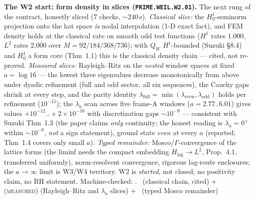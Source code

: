 \documentclass[11pt,a4paper]{article}
\theoremstyle{definition}
\begin{document}
\par\smallskip\noindent\textbf{The W2 start: form density in slices
(\texttt{PRIME.WEIL.W2.01}).}
The next rung of the contract, honestly sliced ($7$ checks,
${\sim}240$\,s).  \emph{Classical slice:} the $H^1_0$-seminorm
projection onto the hat space \emph{is} nodal interpolation (1-D exact
fact), and FEM density holds at the classical rate on smooth odd test
functions ($H^1$ rates $1.000$, $L^2$ rates $2.000$ over
$M=92/184/368/736$); with $Q_W$ $H^1$-bounded (Suzuki \S8.4) and
$H^1_0$ a form core (Thm~1.1) this is the classical density chain ---
cited, not re-proved.  \emph{Measured slices:} Rayleigh--Ritz on the
\emph{nested} window spaces at fixed $a=\log16$ --- the lowest three
eigenvalues decrease monotonically from above under dyadic refinement
(full and odd sector, all six sequences), the Cauchy gaps shrink at
every step, and the parity identity
$\lambda_{\mathrm{full}}=\min(\lambda_{\mathrm{even}},
\lambda_{\mathrm{odd}})$ holds per refinement ($10^{-15}$); the
$\lambda_a$ scan across five frame-A windows ($a=2.77..6.01$) gives
values $+10^{-12}..+2\times10^{-10}$ with discretization gaps
${\sim}10^{-9}$ --- consistent with Suzuki Thm~1.3 (the paper claims
\emph{only} continuity; the honest reading is $\lambda_a=0^+$ within
${\sim}10^{-9}$, \emph{not} a sign statement), ground state
\emph{even} at every $a$ (reported; Thm~1.4 covers only small $a$).
\emph{Typed remainder:} Mosco/$\Gamma$-convergence of the lattice
forms (the liminf needs the compact embedding
$H_{\log}\to L^2$, Prop.~4.1, transferred uniformly), norm-resolvent
convergence, rigorous lag-route enclosures; the $a\to\infty$ limit is
W3/W4 territory.  W2 is \emph{started}, not closed; no positivity
claim, no RH statement.
Machine-checked: .
\mC\ (classical chain, cited) $+$ (\textsc{measured}) (Rayleigh--Ritz
and $\lambda_a$ slices) $+$ \mC\ (typed Mosco remainder)
\par\smallskip
\end{document}
